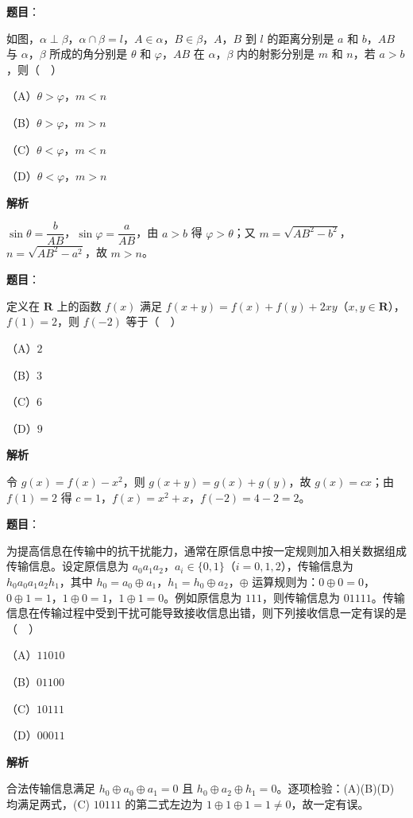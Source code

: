 \begin{answer}

\textbf{题目}：

如图，$\alpha\perp\beta$，$\alpha\cap\beta=l$，$A\in\alpha$，$B\in\beta$，$A$，$B$ 到 $l$ 的距离分别是 $a$ 和 $b$，$AB$ 与 $\alpha$，$\beta$ 所成的角分别是 $\theta$ 和 $\varphi$，$AB$ 在 $\alpha$，$\beta$ 内的射影分别是 $m$ 和 $n$，若 $a>b$，则（　）
\nopagebreak[4]
\begin{center}\end{center}
\nopagebreak[4]
（A）$\theta>\varphi$，$m<n$

（B）$\theta>\varphi$，$m>n$

（C）$\theta<\varphi$，$m<n$

（D）$\theta<\varphi$，$m>n$

\textbf{解析}

$\sin\theta=\dfrac b{AB}$，$\sin\varphi=\dfrac a{AB}$，由 $a>b$ 得 $\varphi>\theta$；又 $m=\sqrt{AB^2-b^2}$，$n=\sqrt{AB^2-a^2}$，故 $m>n$。


\end{answer}
\begin{answer}

\textbf{题目}：

定义在 $\mathbf R$ 上的函数 $f(x)$ 满足 $f(x+y)=f(x)+f(y)+2xy$（$x,y\in\mathbf R$），$f(1)=2$，则 $f(-2)$ 等于（　）

（A）$2$

（B）$3$

（C）$6$

（D）$9$

\textbf{解析}

令 $g(x)=f(x)-x^2$，则 $g(x+y)=g(x)+g(y)$，故 $g(x)=cx$；由 $f(1)=2$ 得 $c=1$，$f(x)=x^2+x$，$f(-2)=4-2=2$。


\end{answer}
\begin{answer}

\textbf{题目}：

为提高信息在传输中的抗干扰能力，通常在原信息中按一定规则加入相关数据组成传输信息。设定原信息为 $a_0a_1a_2$，$a_i\in\{0,1\}$（$i=0,1,2$），传输信息为 $h_0a_0a_1a_2h_1$，其中 $h_0=a_0\oplus a_1$，$h_1=h_0\oplus a_2$，$\oplus$ 运算规则为：$0\oplus0=0$，$0\oplus1=1$，$1\oplus0=1$，$1\oplus1=0$。例如原信息为 $111$，则传输信息为 $01111$。传输信息在传输过程中受到干扰可能导致接收信息出错，则下列接收信息一定有误的是（　）

（A）$11010$

（B）$01100$

（C）$10111$

（D）$00011$

\textbf{解析}

合法传输信息满足 $h_0\oplus a_0\oplus a_1=0$ 且 $h_0\oplus a_2\oplus h_1=0$。逐项检验：(A)(B)(D) 均满足两式，(C) $10111$ 的第二式左边为 $1\oplus1\oplus1=1\neq0$，故一定有误。


\end{answer}
